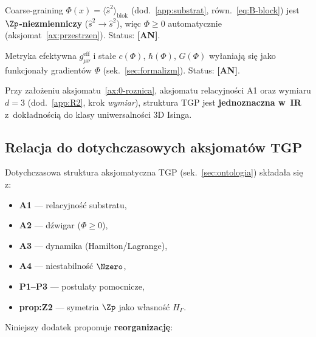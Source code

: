 \begin{chain}%
\label{chain:0-krok4}
Coarse-graining $\Phi(x) = \langle \hat{s}^2 \rangle_{\mathrm{blok}}$
(dod.~\ref{app:substrat}, r\'own.~\ref{eq:B-block}) jest
\textbf{$\Zp$-niezmienniczy} ($\hat{s}^2 \to \hat{s}^2$), wi\k{e}c
$\Phi \geq 0$ automatycznie (aksjomat~\ref{ax:przestrzen}).
Status: \textbf{[AN]}.
\end{chain}

\begin{chain}%
\label{chain:0-krok5}
Metryka efektywna $g_{\mu\nu}^{\mathrm{eff}}$ i sta\l{}e $c(\Phi)$,
$\hbar(\Phi)$, $G(\Phi)$ wy\l{}aniaj\k{a} si\k{e} jako funkcjona\l{}y
gradient\'ow $\Phi$ (sek.~\ref{sec:formalizm}). Status: \textbf{[AN]}.
\end{chain}

\begin{corollary}\label{cor:0-jednoznacznosc}
Przy za\l{}o\.zeniu aksjomatu~\ref{ax:0-roznica}, aksjomatu
relacyjności A1 oraz wymiaru $d=3$ (dod.~\ref{app:R2}, krok
\emph{wymiar}), struktura TGP jest \textbf{jednoznaczna w~IR}
z~dok\l{}adnością do klasy uniwersalności 3D Isinga.
\end{corollary}

\subsection{Relacja do dotychczasowych aksjomat\'ow TGP}%
\label{app:0-relacja}

Dotychczasowa struktura aksjomatyczna TGP (sek.~\ref{sec:ontologia})
sk\l{}ada\l{}a si\k{e} z:
\begin{itemize}[nosep]
  \item \textbf{A1} --- relacyjno\'s\'c substratu,
  \item \textbf{A2} --- d\'zwigar ($\Phi \geq 0$),
  \item \textbf{A3} --- dynamika (Hamilton/Lagrange),
  \item \textbf{A4} --- niestabilność $\Nzero$,
  \item \textbf{P1--P3} --- postulaty pomocnicze,
  \item \textbf{prop:Z2} --- symetria $\Zp$ jako w\l{}asność
    $H_\Gamma$.
\end{itemize}

Niniejszy dodatek proponuje \textbf{reorganizacj\k{e}}:

